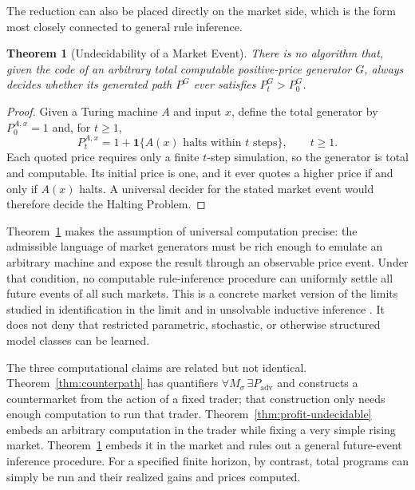 \documentclass[aps,pra,reprint,superscriptaddress,amsmath,amssymb,floatfix]{revtex4-2}
\theoremstyle{plain}
\newtheorem{theorem}{Theorem}
\theoremstyle{definition}
\theoremstyle{remark}
\begin{document}
The reduction can also be placed directly on the market side, which is the
form most closely connected to general rule inference.

\begin{theorem}[Undecidability of a Market Event]
  \label{thm:market-undecidable}
  There is no algorithm that, given the code of an arbitrary total computable
  positive-price generator \(G\), always decides whether its generated path
  \(P^G\) ever satisfies \(P_t^G>P_0^G\).
\end{theorem}

\begin{proof}
Given a Turing machine \(A\) and input \(x\), define the total generator by
\(P_0^{A,x}=1\) and, for \(t\geq1\),
\begin{equation}
  P_t^{A,x}
  =1+\mathbf{1}\{A(x)\text{ halts within }t\text{ steps}\},
  \qquad t\geq1 .
  \label{eq:market-halting}
\end{equation}
Each quoted price requires only a finite \(t\)-step simulation, so the
generator is total and computable. Its initial price is one, and it ever quotes
a higher price if and only if \(A(x)\) halts. A universal decider for the stated
market event would therefore decide the Halting Problem.
\end{proof}

Theorem~\ref{thm:market-undecidable} makes the assumption of universal
computation precise: the admissible language of market generators must be rich
enough to emulate an arbitrary machine and expose the result through an
observable price event. Under that condition, no computable rule-inference
procedure can uniformly settle all future events of all such markets. This is
a concrete market version of the limits studied in identification in the limit
and in unsolvable inductive inference
\cite{go-67,blum75blum,angluin:83,ad-91,2016-AlexanderKarlSvozil-ml,moore}.
It does not deny that restricted parametric, stochastic, or otherwise
structured model classes can be learned.

The three computational claims are related but not identical.
Theorem~\ref{thm:counterpath} has quantifiers
\(\forall M_\sigma\,\exists P_{\mathrm{adv}}\) and constructs a countermarket
from the action of a fixed trader; that construction only needs enough
computation to run that trader. Theorem~\ref{thm:profit-undecidable} embeds an
arbitrary computation in the trader while fixing a very simple rising market.
Theorem~\ref{thm:market-undecidable} embeds it in the market and rules out a
general future-event inference procedure. For a specified finite horizon, by
contrast, total programs can simply be run and their realized gains and prices
computed.
\end{document}
